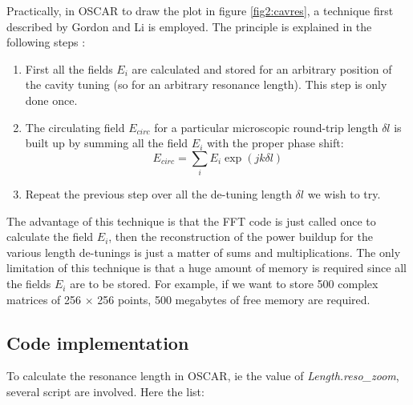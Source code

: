 Practically, in OSCAR to draw the plot in figure \ref{fig2:cavres}, a technique first described by Gordon and Li\cite{Gordon} is employed. The principle is explained in the following steps :
\begin{enumerate}
  \item First all the fields $E_i$ are calculated and stored for an arbitrary position of the cavity tuning (so for an arbitrary resonance length). This step is only done once.
  \item The circulating field $E_{circ}$ for a particular microscopic round-trip length $\delta l$ is built up by summing all the field $E_i$ with the proper phase shift:
      \begin{equation}
      \label{eq2:buildup}
      E_{circ} = \sum_i E_i \exp\left(j k \delta l \right)
      \end{equation}
  \item Repeat the previous step over all the de-tuning length $\delta l$ we wish to try.
\end{enumerate}

The advantage of this technique is that the FFT code is just called once to calculate the field $E_i$, then the reconstruction of the power buildup for the various length de-tunings is just a matter of sums and multiplications. The only limitation of this technique is that a huge amount of memory is required since all the fields $E_i$ are to be stored. For example, if we want to store 500 complex matrices of 256 $\times$ 256 points,  500 megabytes of free memory are required.


\subsection{Code implementation}
\label{sec2:2.2.3}
To calculate the resonance length in OSCAR, ie the value of \textsl{Length.reso\_zoom}, several script are involved. Here the list:

